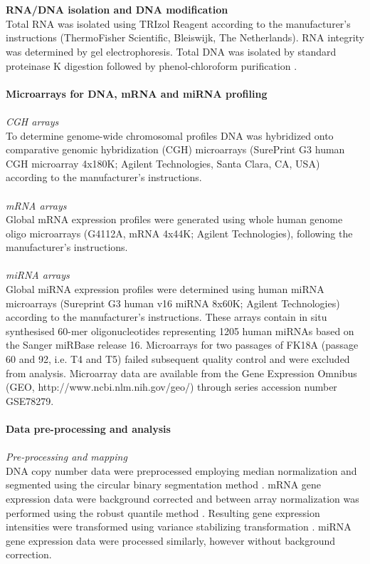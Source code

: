 \\
\\
\textbf{RNA/DNA isolation and DNA modification}
\\
Total RNA was isolated using TRIzol Reagent according to the manufacturer’s instructions (ThermoFisher Scientific, Bleiswijk, The Netherlands). RNA integrity was determined by gel electrophoresis. Total DNA was isolated by standard proteinase K digestion followed by phenol-chloroform purification \cite{VanZeeburg2005}.
\\
\\
\textbf{Microarrays for DNA, mRNA and miRNA profiling}
\\
\\
\textit{CGH arrays}
\\
To determine genome-wide chromosomal profiles DNA was hybridized onto comparative genomic hybridization (CGH) microarrays (SurePrint G3 human CGH microarray 4x180K; Agilent Technologies, Santa Clara, CA, USA) according to the manufacturer’s instructions.
\\
\\
\textit{mRNA arrays}
\\
Global mRNA expression profiles were generated using whole human genome oligo microarrays (G4112A, mRNA 4x44K; Agilent Technologies), following the manufacturer’s instructions.
\\
\\
\textit{miRNA arrays}
\\
Global miRNA expression profiles were determined using human miRNA microarrays (Sureprint G3 human v16 miRNA 8x60K; Agilent Technologies) according to the manufacturer’s instructions. These arrays contain in situ synthesised 60-mer oligonucleotides representing 1205 human miRNAs based on the Sanger miRBase release 16. Microarrays for two passages of FK18A (passage 60 and 92, i.e. T4 and T5) failed subsequent quality control and were excluded from analysis. Microarray data are available from the Gene Expression Omnibus (GEO, http://www.ncbi.nlm.nih.gov/geo/) through series accession number GSE78279.
\\
\\
\textbf{Data pre-processing and analysis}
\\
\\
\textit{Pre-processing and mapping}
\\
DNA copy number data were preprocessed employing median normalization and segmented using the circular binary segmentation method \cite{Olshen2004}. mRNA gene expression data were background corrected \cite{Irizarry2003} and between array normalization was performed using the robust quantile method \cite{Boldstad2003}. Resulting gene expression intensities were transformed using variance stabilizing transformation \cite{Huber2002}. miRNA gene expression data were processed similarly, however without background correction. 

